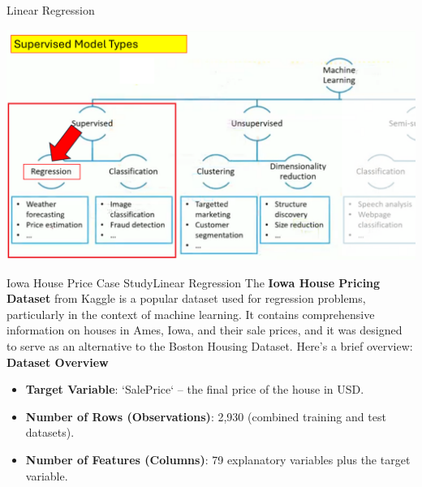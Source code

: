 \documentclass[11pt]{beamer}
\begin{document}
\begin{frame}{Linear Regression}
	\begin{center}
	\includegraphics[scale=.35]{../05-pictures/lesson-3-1_pic_0.png}
	\end{center}
\end{frame}
\begin{frame}{Iowa House Price Case Study}{Linear Regression}
The \textbf{Iowa House Pricing Dataset} from Kaggle is a popular dataset used for regression problems, particularly in the context of machine learning. It contains comprehensive information on houses in Ames, Iowa, and their sale prices, and it was designed to serve as an alternative to the Boston Housing Dataset. Here's a brief overview:
\vspace{.5cm}
\textbf{Dataset Overview}
\begin{itemize}
\item \textbf{Target Variable}: `SalePrice` – the final price of the house in USD.
\item \textbf{Number of Rows (Observations)}: 2,930 (combined training and test datasets).
\item \textbf{Number of Features (Columns)}: 79 explanatory variables plus the target variable.
\end{itemize}

\end{frame}
\end{document}
